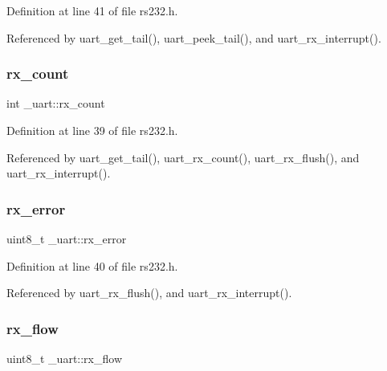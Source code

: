 Definition at line 41 of file rs232.\+h.



Referenced by uart\+\_\+get\+\_\+tail(), uart\+\_\+peek\+\_\+tail(), and uart\+\_\+rx\+\_\+interrupt().

\mbox{\label{struct__uart_a50b344402c339343e3f32c82358e190c}} 
\subsubsection{\texorpdfstring{rx\+\_\+count}{rx\_count}}
{\footnotesize\ttfamily int \+\_\+uart\+::rx\+\_\+count}



Definition at line 39 of file rs232.\+h.



Referenced by uart\+\_\+get\+\_\+tail(), uart\+\_\+rx\+\_\+count(), uart\+\_\+rx\+\_\+flush(), and uart\+\_\+rx\+\_\+interrupt().

\mbox{\label{struct__uart_a6c0b44754c36dd831e1da4f02b124167}} 
\subsubsection{\texorpdfstring{rx\+\_\+error}{rx\_error}}
{\footnotesize\ttfamily uint8\+\_\+t \+\_\+uart\+::rx\+\_\+error}



Definition at line 40 of file rs232.\+h.



Referenced by uart\+\_\+rx\+\_\+flush(), and uart\+\_\+rx\+\_\+interrupt().

\mbox{\label{struct__uart_a193691b69079880daf5b5b9894fb6aa5}} 
\subsubsection{\texorpdfstring{rx\+\_\+flow}{rx\_flow}}
{\footnotesize\ttfamily uint8\+\_\+t \+\_\+uart\+::rx\+\_\+flow}



